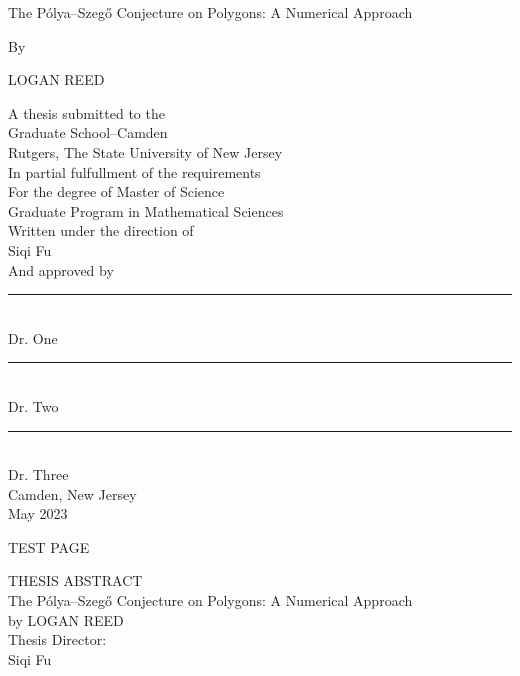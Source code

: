 \documentclass[12pt]{report}
\numberwithin{definition}{section}
\begin{document}
  \doublespacing
  
\begin{titlepage}

   \begin{center}
      

      The Pólya–Szegő Conjecture on Polygons: A Numerical Approach

            
     
       By
              


      LOGAN REED

     
            
        A thesis submitted to the \\
       Graduate School–Camden\\
       Rutgers, The State University of New Jersey\\
       In partial fulfullment of the requirements\\
       For the degree of Master of Science\\
       Graduate Program in Mathematical Sciences \\
       Written under the direction of \\
       Siqi Fu\\
       And approved by \\
       \noindent\rule{4cm}{0.4pt}\\
       Dr. One\\
      \noindent\rule{4cm}{0.4pt}\\
       Dr. Two\\
           \noindent\rule{4cm}{0.4pt}\\
       Dr. Three\\

         \vspace{0.8cm}
       Camden, New Jersey\\
       May 2023
            
       \vspace{0.8cm}
     
  
        
            
   \end{center}
   
\end{titlepage}




\break
TEST PAGE

  \begin{center}

\break
  THESIS ABSTRACT\\
 
      The Pólya–Szegő Conjecture on Polygons: A Numerical Approach \\
         by LOGAN REED\\
     
     Thesis Director: \\
     Siqi Fu
  \end {center}
\end{document}
